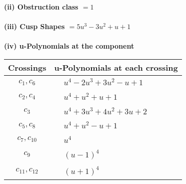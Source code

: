 \documentclass[1p]{elsarticle_modified}
\theoremstyle{definition}
\begin{document}
\flushleft \textbf{(ii) Obstruction class $= 1$}\\~\\
\flushleft \textbf{(iii) Cusp Shapes $= 5 u^3-3 u^2+u+1$}\\~\\
\newpage\renewcommand{\arraystretch}{1}
\flushleft \textbf{(iv) u-Polynomials at the component}\newline \\
\begin{tabular}{m{50pt}|m{274pt}}
Crossings & \hspace{64pt}u-Polynomials at each crossing \\
\hline $$\begin{aligned}c_{1},c_{6}\end{aligned}$$&$\begin{aligned}
&u^4-2 u^3+3 u^2- u+1
\end{aligned}$\\
\hline $$\begin{aligned}c_{2},c_{4}\end{aligned}$$&$\begin{aligned}
&u^4+u^2+u+1
\end{aligned}$\\
\hline $$\begin{aligned}c_{3}\end{aligned}$$&$\begin{aligned}
&u^4+3 u^3+4 u^2+3 u+2
\end{aligned}$\\
\hline $$\begin{aligned}c_{5},c_{8}\end{aligned}$$&$\begin{aligned}
&u^4+u^2- u+1
\end{aligned}$\\
\hline $$\begin{aligned}c_{7},c_{10}\end{aligned}$$&$\begin{aligned}
&u^4
\end{aligned}$\\
\hline $$\begin{aligned}c_{9}\end{aligned}$$&$\begin{aligned}
&(u-1)^4
\end{aligned}$\\
\hline $$\begin{aligned}c_{11},c_{12}\end{aligned}$$&$\begin{aligned}
&(u+1)^4
\end{aligned}$\\
\hline
\end{tabular}\\~\\
\end{document}
